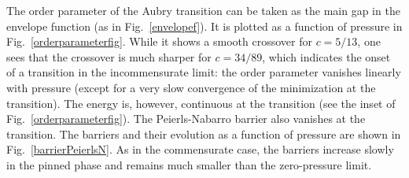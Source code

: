 \documentclass[]{revtex4-1}
\begin{document}
The order parameter of the Aubry transition can be taken as the main gap in the envelope function (as in Fig.~\ref{envelopef}). It is plotted as a function of pressure in Fig.~\ref{orderparameterfig}. While it shows a smooth crossover for $c=5/13$, one sees that the crossover is much sharper for $c=34/89$, which indicates the onset of a transition in the incommensurate limit: the order parameter vanishes linearly with pressure (except for a very slow convergence of the minimization at the transition). The energy is, however, continuous at the transition (see the inset of Fig.~\ref{orderparameterfig}). The Peierls-Nabarro barrier also vanishes at the transition. The barriers and their evolution as a function of pressure are shown in Fig.~\ref{barrierPeierlsN}. As in the commensurate case, the barriers increase slowly in the pinned phase and remains much smaller than the zero-pressure limit. 

\begin{figure*}[t] \begin{center}
           \end{center}      \caption{Envelope functions for the $c=\frac{34}{89}$ approximant of the incommensurate case, for different pressures $p$, showing an Aubry transition from a continuous to a discontinuous envelope function. Here $\lambda=1.90$, $\xi=2$.}
  \label{envelopef}
\end{figure*}
\begin{figure*}[t] \begin{center}
           \end{center}      \caption{Energy bands in the unfolded Brillouin zone for the $c=\frac{34}{89}$ approximant of the incommensurate case, for different pressures $p$ showing gap openings at low pressures.  $\lambda=1.90$, $\xi=2$.}
  \label{bandsallp}
\end{figure*}
\end{document}
